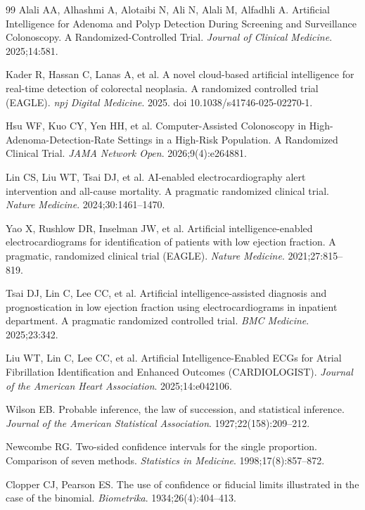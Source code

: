 \documentclass{article}
\begin{document}
\begin{thebibliography}{99}
 Alali AA, Alhashmi A, Alotaibi N, Ali N, Alali M, Alfadhli A. Artificial
Intelligence for Adenoma and Polyp Detection During Screening and Surveillance Colonoscopy. A
Randomized-Controlled Trial. \emph{Journal of Clinical Medicine}. 2025;14:581.

 Kader R, Hassan C, Lanas A, et al. A novel cloud-based artificial intelligence
for real-time detection of colorectal neoplasia. A randomized controlled trial (EAGLE).
\emph{npj Digital Medicine}. 2025. doi 10.1038/s41746-025-02270-1.

 Hsu WF, Kuo CY, Yen HH, et al. Computer-Assisted Colonoscopy in
High-Adenoma-Detection-Rate Settings in a High-Risk Population. A Randomized Clinical Trial.
\emph{JAMA Network Open}. 2026;9(4):e264881.

 Lin CS, Liu WT, Tsai DJ, et al. AI-enabled electrocardiography alert intervention
and all-cause mortality. A pragmatic randomized clinical trial. \emph{Nature Medicine}.
2024;30:1461--1470.

 Yao X, Rushlow DR, Inselman JW, et al. Artificial intelligence-enabled
electrocardiograms for identification of patients with low ejection fraction. A pragmatic,
randomized clinical trial (EAGLE). \emph{Nature Medicine}. 2021;27:815--819.

 Tsai DJ, Lin C, Lee CC, et al. Artificial intelligence-assisted diagnosis and
prognostication in low ejection fraction using electrocardiograms in inpatient department. A
pragmatic randomized controlled trial. \emph{BMC Medicine}. 2025;23:342.

 Liu WT, Lin C, Lee CC, et al. Artificial Intelligence-Enabled ECGs for Atrial
Fibrillation Identification and Enhanced Outcomes (CARDIOLOGIST). \emph{Journal of the American
Heart Association}. 2025;14:e042106.

 Wilson EB. Probable inference, the law of succession, and statistical
inference. \emph{Journal of the American Statistical Association}. 1927;22(158):209--212.

 Newcombe RG. Two-sided confidence intervals for the single proportion.
Comparison of seven methods. \emph{Statistics in Medicine}. 1998;17(8):857--872.

 Clopper CJ, Pearson ES. The use of confidence or fiducial limits illustrated
in the case of the binomial. \emph{Biometrika}. 1934;26(4):404--413.


\end{thebibliography}
\end{document}
